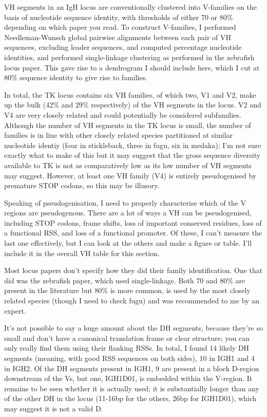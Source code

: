 VH segments in an IgH locus are conventionally clustered into V-families on the basis of nucleotide sequence identity, with thresholds of either 70 or 80\% depending on which paper you read. To construct V-families, I performed Needleman-Wunsch global pairwise alignments between each pair of VH sequences, excluding leader sequences, and computed percentage nucleotide identities, and performed single-linkage clustering as performed in the zebrafish locus paper. This gave rise to a dendrogram I should include here, which I cut at 80\% sequence identity to give rise to families.

In total, the TK locus contains six VH families, of which two, V1 and V2, make up the bulk (42\% and 29\% respectively) of the VH segments in the locus. V2 and V4 are very closely related and could potentially be considered subfamilies. Although the number of VH segments in the TK locus is small, the number of families is in line with other closely related species partitioned at similar nucleotide identiy (four in stickleback, three in fugu, six in medaka); I'm not sure exactly what to make of this but it may suggest that the gross sequence diversity available to TK is not as comparatively low as its low number of VH segments may suggest. However, at least one VH family (V4) is entirely pseudogenised by premature STOP codons, so this may be illusory.

Speaking of pseudogenisation, I need to properly characterise which of the V regions are pseudogenous. There are a lot of ways a VH can be pseudogenised, including STOP codons, frame shifts, loss of important conserved residues, loss of a functional RSS, and loss of a functional promoter. Of these, I can't measure the last one effectively, but I can look at the others and make a figure or table. I'll include it in the overall VH table for this section.


Most locus papers don't specify how they did their family identification. One that did was the zebrafish paper, which used single-linkage. Both 70 and 80\% are present in the literature but 80\% is more common, is used by the most closely related species (though I need to check fugu) and was recommended to me by an expert.


It's not possible to say a huge amount about the DH segments, because they're so small and don't have a canonical translation frame or clear structure; you can only really find them using their flanking RSSs. In total, I found 14 likely DH segments (meaning, with good RSS sequences on both sides), 10 in IGH1 and 4 in IGH2. Of the DH segments present in IGH1, 9 are present in a block D-region downstream of the Vs, but one, IGH1D01, is embedded within the V-region. It remains to be seen whether it is actually used; it is substantially longer than any of the other DH in the locus (11-16bp for the others, 26bp for IGH1D01), which may suggest it is not a valid D.

